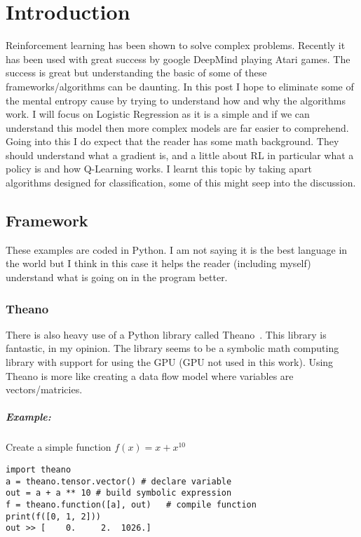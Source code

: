 \chapter{Introduction}
\label{chapter:introduction}

Reinforcement learning has been shown to solve complex problems. Recently it has been used with great success by google DeepMind playing Atari games. The success is great but understanding the basic of some of these frameworks/algorithms can be daunting. In this post I hope to eliminate some of the mental entropy cause by trying to understand how and why the algorithms work. I will focus on Logistic Regression as it is a simple and if we can understand this model then more complex models are far easier to comprehend. 
Going into this I do expect that the reader has some math background. They should understand what a gradient is, and a little about RL in particular what a policy is and how Q-Learning works. I learnt this topic by taking apart algorithms designed for classification, some of this might seep into the discussion.

\section{Framework}

These examples are coded in Python. I am not saying it is the best language in the world but I think in this case it helps the reader (including myself) understand what is going on in the program better.

\subsection{Theano}

There is also heavy use of a Python library called Theano~\cite{Bastien-Theano-2012}. This library is fantastic, in my opinion. The library seems to be a symbolic math computing library with support for using the GPU (GPU not used in this work). Using Theano is more like creating a data flow model where variables are vectors/matricies.

\paragraph{Example:} Create a simple function $f(x)=x+x^{10}$

\begin{lstlisting}
import theano
a = theano.tensor.vector() # declare variable
out = a + a ** 10 # build symbolic expression
f = theano.function([a], out)   # compile function
print(f([0, 1, 2]))
out >> [    0.     2.  1026.]
\end{lstlisting}
 

